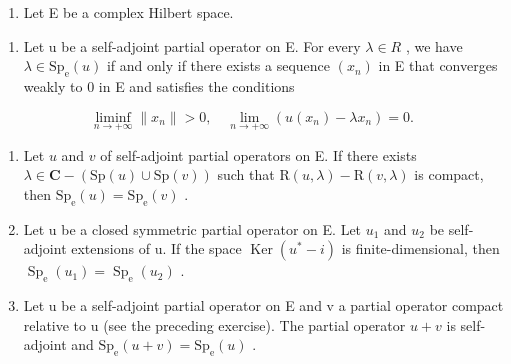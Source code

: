\begin{enumerate}
\def\labelenumi{\arabic{enumi})}
\setcounter{enumi}{42}
\tightlist
\item
  Let E be a complex Hilbert space.
\end{enumerate}

\begin{enumerate}
\def\labelenumi{\alph{enumi})}
\tightlist
\item
  Let u be a self-adjoint partial operator on E. For every \(\lambda \in R\) , we have \(\lambda \in \mathrm{Sp}_{\mathrm{e}}(u)\) if and only if there exists a sequence \((x_{n})\) in E that converges weakly to 0 in E and satisfies the conditions
\end{enumerate}

\[
\liminf _ {n \to + \infty} \| x _ {n} \| > 0, \quad \lim _ {n \to + \infty} (u (x _ {n}) - \lambda x _ {n}) = 0.
\]

\begin{enumerate}
\def\labelenumi{\alph{enumi})}
\setcounter{enumi}{1}
\item
  Let \(u\) and \(v\) of self-adjoint partial operators on E. If there exists \(\lambda \in \mathbf{C} - (\mathrm{Sp}(u) \cup \mathrm{Sp}(v))\) such that \(\mathrm{R}(u, \lambda) - \mathrm{R}(v, \lambda)\) is compact, then \(\mathrm{Sp}_{\mathrm{e}}(u) = \mathrm{Sp}_{\mathrm{e}}(v)\) .
\item
  Let u be a closed symmetric partial operator on E. Let \(u_{1}\) and \(u_{2}\) be self-adjoint extensions of u. If the space \(\operatorname{Ker}(u^{*}-i)\) is finite-dimensional, then \(\operatorname{Sp}_{\mathrm{e}}(u_{1})=\operatorname{Sp}_{\mathrm{e}}(u_{2})\) .
\item
  Let u be a self-adjoint partial operator on E and v a partial operator compact relative to u (see the preceding exercise). The partial operator \(u + v\) is self-adjoint and \(\mathrm{Sp}_{\mathrm{e}}(u + v) = \mathrm{Sp}_{\mathrm{e}}(u)\) .
\end{enumerate}

